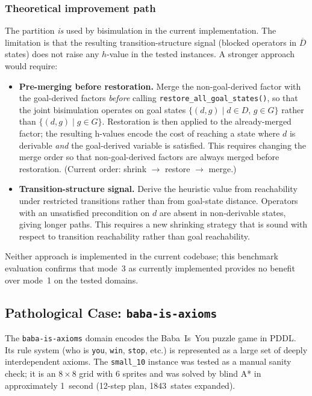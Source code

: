 \documentclass[11pt,a4paper]{article}
\begin{document}
\subsubsection*{Theoretical improvement path}

The partition \emph{is} used by bisimulation in the current implementation.
The limitation is that the resulting transition-structure signal (blocked
operators in $\overline{D}$ states) does not raise any $h$-value in the
tested instances.  A stronger approach would require:

\begin{itemize}
  \item \textbf{Pre-merging before restoration.}  Merge the non-goal-derived
        factor with the goal-derived factors \emph{before} calling
        \texttt{restore\_all\_goal\_states()}, so that the joint bisimulation
        operates on goal states $\{(d, g) \mid d \in D,\, g \in G\}$ rather
        than $\{(d, g) \mid g \in G\}$.  Restoration is then applied to the
        already-merged factor; the resulting h-values encode the cost of
        reaching a state where $d$ is derivable \emph{and} the goal-derived
        variable is satisfied.  This requires changing the merge order so that
        non-goal-derived factors are always merged before restoration.
        (Current order: shrink $\to$ restore $\to$ merge.)

  \item \textbf{Transition-structure signal.}  Derive the heuristic value
        from reachability under restricted transitions rather than from
        goal-state distance.  Operators with an unsatisfied precondition on
        $d$ are absent in non-derivable states, giving longer paths.  This
        requires a new shrinking strategy that is sound with respect to
        transition reachability rather than goal reachability.
\end{itemize}

Neither approach is implemented in the current codebase; this benchmark
evaluation confirms that mode~3 as currently implemented provides no benefit
over mode~1 on the tested domains.

\subsection{Pathological Case: \texttt{baba-is-axioms}}
\label{sec:baba-pathological}

The \texttt{baba-is-axioms} domain encodes the Baba~Is~You puzzle game in
PDDL\@.  Its rule system (who is \texttt{you}, \texttt{win}, \texttt{stop},
etc.) is represented as a large set of deeply interdependent axioms.  The
\texttt{small\_10} instance was tested as a manual sanity check; it is an
$8\times 8$ grid with 6 sprites and was solved by blind A* in approximately
1~second (12-step plan, 1843~states expanded).
\end{document}
